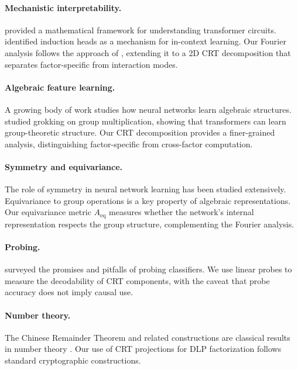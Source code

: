 \documentclass[11pt,a4paper]{article}
\theoremstyle{definition}
\theoremstyle{remark}
\newcommand{\Aeq}{A_{\mathrm{eq}}}
\begin{document}
\paragraph{Mechanistic interpretability.} \citet{elhage2021transformer} provided a mathematical framework for understanding transformer circuits. \citet{olsson2022inference} identified induction heads as a mechanism for in-context learning. Our Fourier analysis follows the approach of \citet{nanda2023progress}, extending it to a 2D CRT decomposition that separates factor-specific from interaction modes.

\paragraph{Algebraic feature learning.} A growing body of work studies how neural networks learn algebraic structures. \citet{thirukovallur2024grokking} studied grokking on group multiplication, showing that transformers can learn group-theoretic structure. Our CRT decomposition provides a finer-grained analysis, distinguishing factor-specific from cross-factor computation.

\paragraph{Symmetry and equivariance.} The role of symmetry in neural network learning has been studied extensively. Equivariance to group operations is a key property of algebraic representations. Our equivariance metric $\Aeq$ measures whether the network's internal representation respects the group structure, complementing the Fourier analysis.

\paragraph{Probing.} \citet{belinkov2022probing} surveyed the promises and pitfalls of probing classifiers. We use linear probes to measure the decodability of CRT components, with the caveat that probe accuracy does not imply causal use.

\paragraph{Number theory.} The Chinese Remainder Theorem and related constructions are classical results in number theory \citep{hardy1979introduction}. Our use of CRT projections for DLP factorization follows standard cryptographic constructions.
\end{document}
